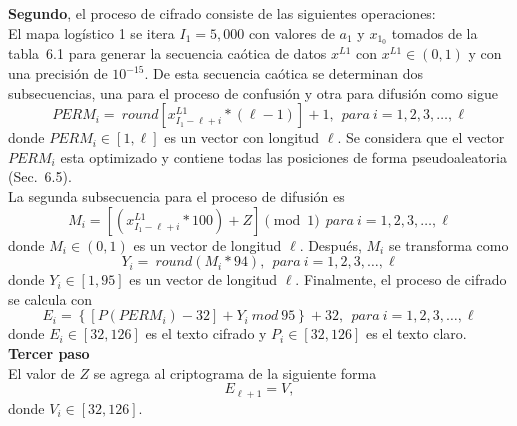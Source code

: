 \textbf{Segundo}, el proceso de cifrado consiste de las siguientes operaciones:   \\

El mapa logístico 1 se itera $I_{1}=5,000$ con valores de $a_{1}$ y $x_{1_{0}}$ tomados de la tabla~6.1 para generar la secuencia caótica de datos $x^{L1}$ con $x^{L1}\in(0,1)$ y con una precisión de $10^{-15}$. De esta secuencia caótica se determinan dos subsecuencias, una para el proceso de confusión y otra para difusión como sigue 
\begin{equation}
PERM_{i}=~round\left[ x_{I_{1}-\ell +i}^{L1}\ast (\ell-1)\right]+1, ~~ para ~i=1,2,3,\ldots ,\ell
\end{equation}
donde $PERM_{i}\in \left[1,\ell \right]$ es un vector con longitud $\ell$. Se considera que el vector $PERM_{i}$ esta optimizado y contiene todas las posiciones de forma pseudoaleatoria (Sec.~6.5). \\

La segunda subsecuencia para el proceso de difusión es
\begin{equation}
M_{i}=\left[ \left(x_{I_{1}-\ell +i}^{L1}\ast 100\right)+Z\right] \pmod 1 ~~ para ~i=1,2,3,\ldots ,\ell
\end{equation}
donde $M_{i}\in \left(0,1\right)$ es un vector de longitud $\ell$. Después, $M_{i}$ se transforma como
\begin{equation}
Y_{i}=~round \left(M_{i}\ast 94 \right), ~~ para ~i=1,2,3,\ldots ,\ell
\end{equation}
donde $Y_{i}\in \left[1,95\right]$ es un vector de longitud $\ell$. Finalmente, el proceso de cifrado se calcula con
\begin{equation}
E_{i}= \left\lbrace \left[P(PERM_{i})-32\right]+Y_{i} ~mod~95 \right\rbrace +32, ~~ para ~i=1,2,3,\ldots ,\ell
\end{equation}
donde $E_{i}\in \left[32,126\right]$ es el texto cifrado y $P_{i}\in \left[32,126\right]$ es el texto claro. \\

\textbf{Tercer paso}\\

El valor de $Z$ se agrega al criptograma de la siguiente forma
\begin{equation}
E_{\ell +1}=V,
\end{equation} 
donde $V_{i}\in \left[32,126\right]$. \\

